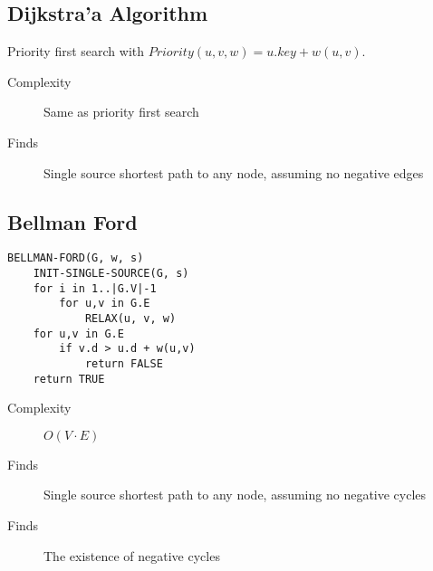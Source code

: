 \documentclass[landscape]{cheat}
\begin{document}
\begin{multicols*}{3}
\subsection{Dijkstra'a Algorithm}
Priority first search with $Priority(u, v, w) = u.key + w(u, v)$.
\begin{description}
    \item[Complexity] Same as priority first search
    \item[Finds] Single source shortest path to any node, assuming no negative edges
\end{description}

\subsection{Bellman Ford}
\begin{lstlisting}
BELLMAN-FORD(G, w, s)
    INIT-SINGLE-SOURCE(G, s)
    for i in 1..|G.V|-1
        for u,v in G.E
            RELAX(u, v, w)
    for u,v in G.E
        if v.d > u.d + w(u,v)
            return FALSE
    return TRUE
\end{lstlisting}
\begin{description}
    \item[Complexity] $O(V\cdot E)$
    \item[Finds] Single source shortest path to any node, assuming no negative cycles
    \item[Finds] The existence of negative cycles
\end{description}

\end{multicols*}
\end{document}
